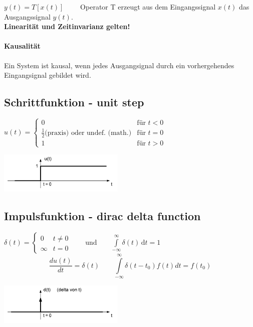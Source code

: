 \begin{center}
	
\end{center}

$ y(t) = T [ x(t)] \qquad $ Operator T erzeugt aus dem Eingangssignal $ x(t) $ das Ausgangssignal $ y(t)$. \\
\textbf{Linearität und Zeitinvarianz gelten!}

\paragraph{Kausalität} Ein System ist kausal, wenn jedes Ausgangsignal durch ein vorhergehendes Eingangsignal gebildet wird.
\\

\subsection{Schrittfunktion - unit step}
\begin{minipage}{10cm}
	$u(t) =	\begin{cases}
	  		 0 & \text{für } t < 0 \\
	  		 \frac{1}{2} \text{(praxis)}  \text{ oder undef. (math.)} & \text{für } t = 0 \\
	  		 1 & \text{für } t > 0
	  	\end{cases}
	$
\end{minipage}
\begin{minipage}{8cm}
	\includegraphics[width=6cm]{bilder/unitstep.png}
\end{minipage}


\subsection{Impulsfunktion - dirac delta function}
	\begin{minipage}{10cm}
		$\delta (t)=\begin{cases} 0 & t\ne 0\\\infty & t=0\end{cases} \qquad
		\text{und} \qquad \int\limits_{-\infty}^\infty \delta(t) \, \mathrm dt = 1 $\\
		$$\frac{du(t)}{dt}=\delta(t) \qquad
		\int\limits_{-\infty}^{\infty}\delta(t-t_0)f(t)dt=f(t_0)$$
	\end{minipage}
	\begin{minipage}{8cm}
		\includegraphics[width=6cm]{bilder/diracimpulse.png}
	\end{minipage}


